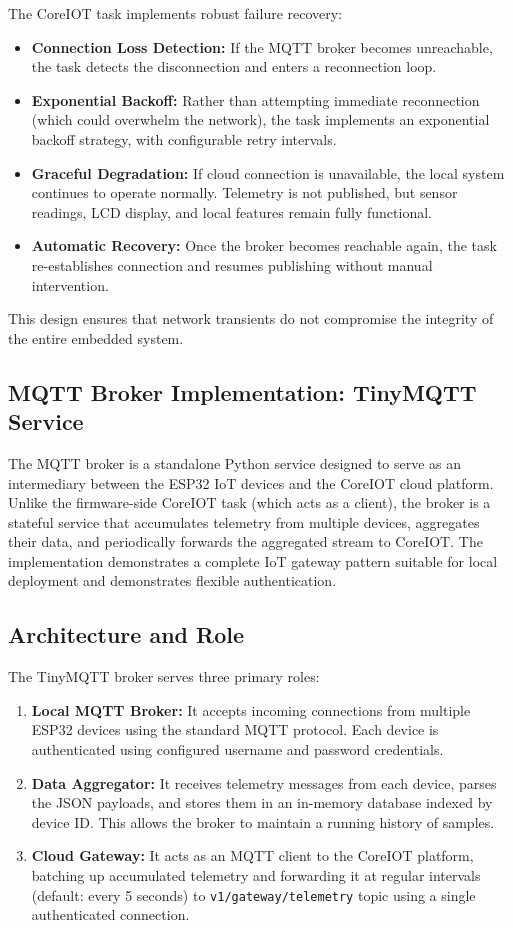 The CoreIOT task implements robust failure recovery:
\begin{itemize}
  \item \textbf{Connection Loss Detection:} If the MQTT broker becomes unreachable, the task detects the disconnection and enters a reconnection loop.
  \item \textbf{Exponential Backoff:} Rather than attempting immediate reconnection (which could overwhelm the network), the task implements an exponential backoff strategy, with configurable retry intervals.
  \item \textbf{Graceful Degradation:} If cloud connection is unavailable, the local system continues to operate normally. Telemetry is not published, but sensor readings, LCD display, and local features remain fully functional.
  \item \textbf{Automatic Recovery:} Once the broker becomes reachable again, the task re-establishes connection and resumes publishing without manual intervention.
\end{itemize}

This design ensures that network transients do not compromise the integrity of the entire embedded system.


\subsection{MQTT Broker Implementation: TinyMQTT Service}

The MQTT broker is a standalone Python service designed to serve as an intermediary between the ESP32 IoT devices and the CoreIOT cloud platform. Unlike the firmware-side CoreIOT task (which acts as a client), the broker is a stateful service that accumulates telemetry from multiple devices, aggregates their data, and periodically forwards the aggregated stream to CoreIOT. The implementation demonstrates a complete IoT gateway pattern suitable for local deployment and demonstrates flexible authentication.

\subsection*{Architecture and Role}

The TinyMQTT broker serves three primary roles:
\begin{enumerate}
  \item \textbf{Local MQTT Broker:} It accepts incoming connections from multiple ESP32 devices using the standard MQTT protocol. Each device is authenticated using configured username and password credentials.
  \item \textbf{Data Aggregator:} It receives telemetry messages from each device, parses the JSON payloads, and stores them in an in-memory database indexed by device ID. This allows the broker to maintain a running history of samples.
  \item \textbf{Cloud Gateway:} It acts as an MQTT client to the CoreIOT platform, batching up accumulated telemetry and forwarding it at regular intervals (default: every 5 seconds) to \texttt{v1/gateway/telemetry} topic using a single authenticated connection.
\end{enumerate}

